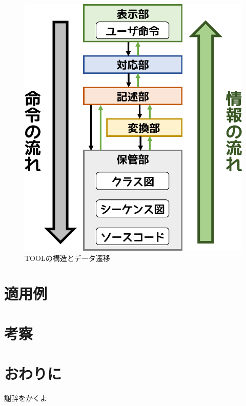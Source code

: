 \documentclass[uplatex, report, a4j, 10pt, dvipdfmx]{jsbook}
\newcommand{\tool}{TOOL}
\begin{document}
\begin{figure}[tp]
  \begin{center}
  \includegraphics[keepaspectratio, width=160mm]{./figs/retussStructure.png}
	\caption{\tool{}の構造とデータ遷移}
	\label{fig:toolStructure2}
\end{center}
\end{figure}

\chapter{適用例}\label{cha:Indication}

\chapter{考察}\label{cha:Evaluation}

\chapter{おわりに} \label{cha:Conclusion}

%
\acknowledgment{}

謝辞をかくよ


%
%

%
\end{document}
